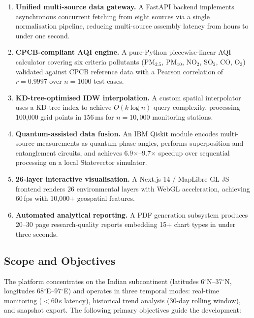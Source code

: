 \documentclass[12pt,a4paper]{article}
\begin{document}
\begin{enumerate}[leftmargin=*, label=\textbf{C\arabic*.}]

\item \textbf{Unified multi-source data gateway.} A FastAPI backend
      implements asynchronous concurrent fetching from eight sources via a
      single normalisation pipeline, reducing multi-source assembly latency from
      hours to under one second.

\item \textbf{CPCB-compliant AQI engine.} A pure-Python piecewise-linear AQI
      calculator covering six criteria pollutants
      ($\text{PM}_{2.5}$, $\text{PM}_{10}$, $\text{NO}_2$, $\text{SO}_2$,
      $\text{CO}$, $\text{O}_3$) validated against CPCB reference data with a
      Pearson correlation of $r = 0.9997$ over $n = 1000$ test cases.

\item \textbf{KD-tree-optimised IDW interpolation.} A custom spatial
      interpolator uses a KD-tree index to achieve $O(k \log n)$ query
      complexity, processing 100,000 grid points in 156\,ms for $n = 10{,}000$
      monitoring stations.

\item \textbf{Quantum-assisted data fusion.} An IBM Qiskit module encodes
      multi-source measurements as quantum phase angles, performs superposition
      and entanglement circuits, and achieves 6.9$\times$--9.7$\times$ speedup
      over sequential processing on a local Statevector simulator.

\item \textbf{26-layer interactive visualisation.} A Next.js 14 / MapLibre GL
      JS frontend renders 26 environmental layers with WebGL acceleration,
      achieving 60\,fps with 10,000+ geospatial features.

\item \textbf{Automated analytical reporting.} A PDF generation subsystem
      produces 20--30 page research-quality reports embedding 15+ chart types
      in under three seconds.

\end{enumerate}

\subsection{Scope and Objectives}
\label{sec:intro:scope}

The platform concentrates on the Indian subcontinent (latitudes
6$^\circ$N--37$^\circ$N, longitudes 68$^\circ$E--97$^\circ$E) and operates
in three temporal modes: real-time monitoring ($<$60\,s latency), historical
trend analysis (30-day rolling window), and snapshot export. The following
primary objectives guide the development:
\end{document}
